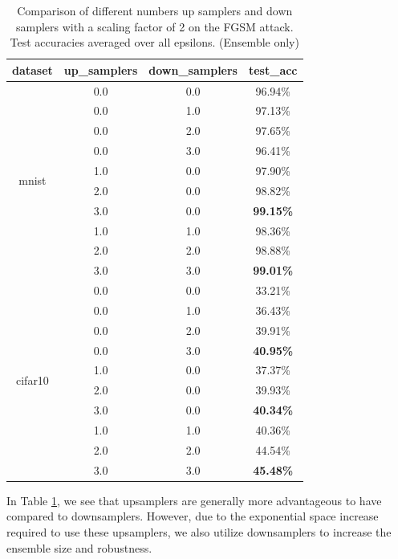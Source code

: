 \documentclass[10pt,journal,compsoc]{IEEEtran}
\begin{document}
\begin{table}[!h]
\renewcommand{\arraystretch}{1.3}
\caption{Comparison of different numbers up samplers and down samplers with a scaling factor of 2 on the FGSM attack. Test accuracies averaged over all epsilons. (Ensemble only)}
\label{table:updown}
\centering
\begin{tabular}{|c|c|c|c|}
\hline
dataset &  up\_samplers &  down\_samplers &  test\_acc \\
 \hline\hline
\multirow{10}{*}{mnist}
   &          0.0 &            0.0 &    96.94\% \\
   &          0.0 &            1.0 &    97.13\% \\
   &          0.0 &            2.0 &    97.65\% \\
   &          0.0 &            3.0 &    96.41\% \\
   &          1.0 &            0.0 &    97.90\% \\
   &          2.0 &            0.0 &    98.82\% \\
   &          3.0 &            0.0 &    \textbf{99.15\%} \\
 \cline{2-4}
   &          1.0 &            1.0 &    98.36\% \\
   &          2.0 &            2.0 &    98.88\% \\
   &          3.0 &            3.0 &    \textbf{99.01\%} \\
\hline\hline
\multirow{10}{*}{cifar10}
 &          0.0 &            0.0 &    33.21\% \\
 &          0.0 &            1.0 &    36.43\% \\
 &          0.0 &            2.0 &    39.91\% \\
 &          0.0 &            3.0 &    \textbf{40.95\%} \\
 &          1.0 &            0.0 &    37.37\% \\
 &          2.0 &            0.0 &    39.93\% \\
 &          3.0 &            0.0 &    \textbf{40.34\%} \\
  \cline{2-4}
 &          1.0 &            1.0 &    40.36\% \\
 &          2.0 &            2.0 &    44.54\% \\
 &          3.0 &            3.0 &    \textbf{45.48\%} \\
\hline
\end{tabular}
\end{table}

In Table \ref{table:updown}, we see that upsamplers are generally more advantageous to have compared to downsamplers. However, due to the exponential space increase required to use these upsamplers, we also utilize downsamplers to increase the ensemble size and robustness. 
\end{document}

